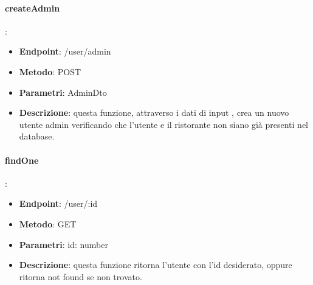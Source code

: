 \paragraph{createAdmin}:
\begin{itemize}
    \item \textbf{Endpoint}: /user/admin
    \item \textbf{Metodo}: POST
    \item \textbf{Parametri}: AdminDto
    \item \textbf{Descrizione}: questa funzione, attraverso i dati di input , crea un nuovo utente admin verificando che l'utente e il ristorante non siano già presenti nel database.
\end{itemize}
\paragraph{findOne}:
\begin{itemize}
    \item \textbf{Endpoint}: /user/:id
    \item \textbf{Metodo}: GET
    \item \textbf{Parametri}: id: number
    \item \textbf{Descrizione}: questa funzione ritorna l'utente con l'id desiderato, oppure ritorna not found se non trovato.
\end{itemize}

\newpage
